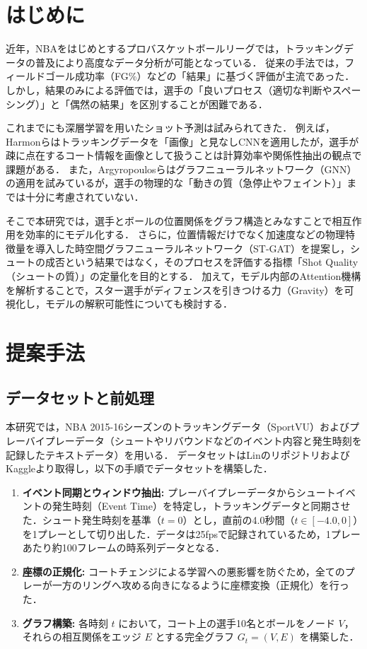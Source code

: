 \documentclass{jarticle}
\begin{document}
\mktitle
\renewcommand{\baselinestretch}{0.95}\small

\section{はじめに}
近年，NBAをはじめとするプロバスケットボールリーグでは，トラッキングデータの普及により高度なデータ分析が可能となっている．
従来の手法では，フィールドゴール成功率（FG\%）などの「結果」に基づく評価が主流であった．
しかし，結果のみによる評価では，選手の「良いプロセス（適切な判断やスペーシング）」と「偶然の結果」を区別することが困難である\cite{cervone}．

これまでにも深層学習を用いたショット予測は試みられてきた．
例えば，Harmonら\cite{harmon}はトラッキングデータを「画像」と見なしCNNを適用したが，選手が疎に点在するコート情報を画像として扱うことは計算効率や関係性抽出の観点で課題がある．
また，Argyropoulosら\cite{medium_gnn}はグラフニューラルネットワーク（GNN）の適用を試みているが，選手の物理的な「動きの質（急停止やフェイント）」までは十分に考慮されていない．

そこで本研究では，選手とボールの位置関係をグラフ構造とみなすことで相互作用を効率的にモデル化する．
さらに，位置情報だけでなく加速度などの物理特徴量を導入した時空間グラフニューラルネットワーク（ST-GAT）を提案し，シュートの成否という結果ではなく，そのプロセスを評価する指標「Shot Quality（シュートの質）」の定量化を目的とする．
加えて，モデル内部のAttention機構を解析することで，スター選手がディフェンスを引きつける力（Gravity）を可視化し，モデルの解釈可能性についても検討する．

\section{提案手法}
\subsection{データセットと前処理}
本研究では，NBA 2015-16シーズンのトラッキングデータ（SportVU）およびプレーバイプレーデータ（シュートやリバウンドなどのイベント内容と発生時刻を記録したテキストデータ）を用いる．
データセットはLin\cite{linouk23}のリポジトリおよびKaggle\cite{kaggle_pbp}より取得し，以下の手順でデータセットを構築した．

\begin{enumerate}
 \item \textbf{イベント同期とウィンドウ抽出:}
 プレーバイプレーデータからシュートイベントの発生時刻（Event Time）を特定し，トラッキングデータと同期させた．シュート発生時刻を基準（$t=0$）とし，直前の4.0秒間（$t \in [-4.0, 0]$）を1プレーとして切り出した．データは25fpsで記録されているため，1プレーあたり約100フレームの時系列データとなる．
 
 \item \textbf{座標の正規化:}
 コートチェンジによる学習への悪影響を防ぐため，全てのプレーが一方のリングへ攻める向きになるように座標変換（正規化）を行った．
 
 \item \textbf{グラフ構築:}
 各時刻 $t$ において，コート上の選手10名とボールをノード $V$，それらの相互関係をエッジ $E$ とする完全グラフ $G_t = (V, E)$ を構築した．
\end{enumerate}
\end{document}
